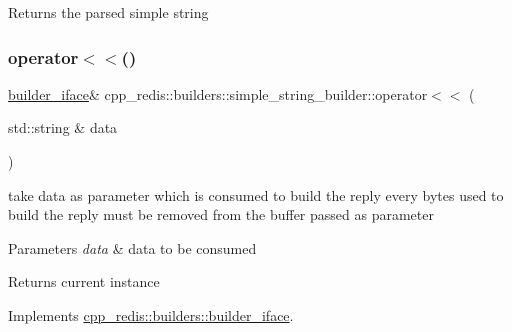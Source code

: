 \begin{DoxyReturn}{Returns}
the parsed simple string 
\end{DoxyReturn}
\mbox{\label{classcpp__redis_1_1builders_1_1simple__string__builder_a159bb512f0427c4a988742f7cd01035e}} 
\subsubsection{\texorpdfstring{operator$<$$<$()}{operator<<()}}
{\footnotesize\ttfamily \hyperlink{classcpp__redis_1_1builders_1_1builder__iface}{builder\+\_\+iface}\& cpp\+\_\+redis\+::builders\+::simple\+\_\+string\+\_\+builder\+::operator$<$$<$ (\begin{DoxyParamCaption}\item[{std\+::string \&}]{data }\end{DoxyParamCaption})\hspace{0.3cm}{\ttfamily [virtual]}}

take data as parameter which is consumed to build the reply every bytes used to build the reply must be removed from the buffer passed as parameter


\begin{DoxyParams}{Parameters}
{\em data} & data to be consumed \\
\hline
\end{DoxyParams}
\begin{DoxyReturn}{Returns}
current instance 
\end{DoxyReturn}


Implements \hyperlink{classcpp__redis_1_1builders_1_1builder__iface_a9892bbc9c887c31c2742dad4476e2fa6}{cpp\+\_\+redis\+::builders\+::builder\+\_\+iface}.

\mbox{\label{classcpp__redis_1_1builders_1_1simple__string__builder_afc86dd3148ef0094d08b4282f7cb597d}} 
